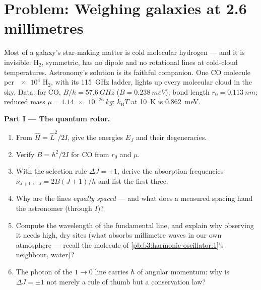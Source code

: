 \section{Problem: Weighing galaxies at 2.6 millimetres}

\begin{problem}\label{pb:b3:quantum-angular-momentum:1}
Most of a galaxy's star-making matter is cold molecular hydrogen ---
and it is invisible: H$_2$, symmetric, has no dipole and no
rotational lines at cold-cloud temperatures. Astronomy's solution is
its faithful companion. One CO molecule per $\num{e4}$ H$_2$, with
its \qty{115}{GHz} ladder, lights up every molecular cloud in the
sky. Data: for CO, $B/h = \qty{57.6}{GHz}$ ($B =
\qty{0.238}{meV}$); bond length $r_0 = \qty{0.113}{nm}$; reduced
mass $\mu = \qty{1.14e-26}{kg}$; $k_{\text{B}}T$ at \qty{10}{K} is
\qty{0.862}{meV}.

\medskip\noindent\textbf{Part I --- The quantum rotor.}
\begin{enumerate}
  \item From $\hat H = \hat L^2/2I$, give the energies $E_J$ and
        their degeneracies.
  \item Verify $B = \hbar^2/2I$ for CO from $r_0$ and $\mu$.
  \item With the selection rule $\Delta J = \pm1$, derive the
        absorption frequencies $\nu_{J+1\leftarrow J} = 2B(J+1)/h$
        and list the first three.
  \item Why are the lines \emph{equally spaced} --- and what does a
        measured spacing hand the astronomer (through $I$)?
  \item Compute the wavelength of the fundamental line, and explain
        why observing it needs high, dry sites (what absorbs
        millimetre waves in our own atmosphere --- recall the
        molecule of \cref{pb:b3:harmonic-oscillator:1}'s
        neighbour, water)?
  \item The photon of the $1 \to 0$ line carries $\hbar$ of angular
        momentum: why is $\Delta J = \pm1$ not merely a rule of
        thumb but a conservation law?
\end{enumerate}


\end{problem}
